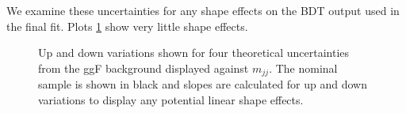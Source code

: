 We examine these uncertainties for any shape effects on the BDT output used in the final fit. Plots \ref{fig:ggftheor} show very little shape effects. 

\begin{figure}[!h]
  \hfill
  \hfill
  \hfill
  \hfill
{\caption{Up and down variations shown for four theoretical uncertainties from the ggF background displayed against $m_{jj}$. The nominal sample is shown in black and slopes are calculated for up and down variations to display any potential linear shape effects.
\label{fig:ggftheor}}}
\end{figure}

